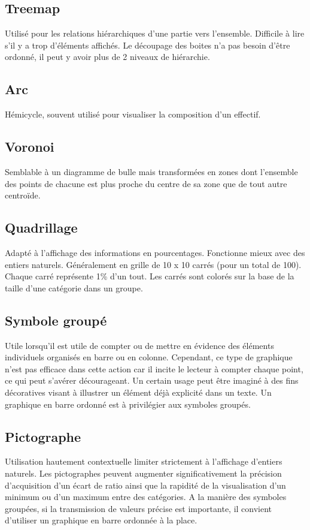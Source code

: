 \documentclass[a4paper,12pt]{article}
\begin{document}
\begin{multicols}{2}
\subsection*{Treemap}
\label{sec:orga0f8348}
Utilisé pour les relations hiérarchiques d'une partie vers l'ensemble. Difficile à lire s'il y a trop d'éléments affichés. \autocite{alansmithLexiqueVisuel}
Le découpage des boites n'a pas besoin d'être ordonné, il peut y avoir plus de 2 niveaux de hiérarchie. \autocite{mikeyiHowChooseRight2020}
\subsection*{Arc}
\label{sec:org904767d}
Hémicycle, souvent utilisé pour visualiser la composition d'un effectif. \autocite{alansmithLexiqueVisuel}
\subsection*{Voronoi}
\label{sec:org86a5940}
Semblable à un diagramme de bulle mais transformées en zones dont l'ensemble des points de chacune est plus proche du centre de sa zone que de tout autre centroïde. \autocite{alansmithLexiqueVisuel}
\subsection*{Quadrillage}
\label{sec:org407b484}
Adapté à l'affichage des informations en pourcentages. Fonctionne mieux avec des entiers naturels. \autocite{alansmithLexiqueVisuel} Généralement en grille de 10 x 10 carrés (pour un total de 100). Chaque carré représente 1\% d'un tout. Les carrés sont colorés sur la base de la taille d'une catégorie dans un groupe. \autocite{mikeyiHowChooseRight2020}
\subsection*{Symbole groupé}
\label{sec:org9c3243c}
Utile lorsqu'il est utile de compter ou de mettre en évidence des éléments individuels organisés en barre ou en colonne. \autocite{alansmithLexiqueVisuel} Cependant, ce type de graphique n'est pas efficace dans cette action car il incite le lecteur à compter chaque point, ce qui peut s'avérer décourageant. \autocite{stephenfewSillyGraphsThat2012} Un certain usage peut être imaginé à des fins décoratives visant à illustrer un élément déjà explicité dans un texte. Un graphique en barre ordonné est à privilégier aux symboles groupés.
\subsection*{Pictographe}
\label{sec:orgbf39538}
Utilisation hautement contextuelle limiter strictement à l'affichage d'entiers naturels. \autocite{alansmithLexiqueVisuel}
Les pictographes peuvent augmenter significativement la précision d'acquisition d'un écart de ratio ainsi que la rapidité de la visualisation d'un minimum ou d'un maximum entre des catégories. \autocite{tranDiscoveringAccessibleData2024} A la manière des symboles groupées, si la transmission de valeurs précise est importante, il convient d'utiliser un graphique en barre ordonnée à la place. \autocite{tranDiscoveringAccessibleData2024}

\end{multicols}
\end{document}
